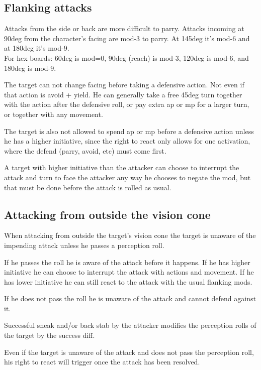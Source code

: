 \subsection*{Flanking attacks}
Attacks from the side or back are more difficult to parry. Attacks incoming at 90deg from the character's facing are mod-3 to parry. At 145deg it's mod-6 and at 180deg it's mod-9.\\
For hex boards: 60deg is mod=0, 90deg (reach) is mod-3, 120deg is mod-6, and 180deg is mod-9.

The target can not change facing before taking a defensive action. Not even if that action is avoid + yield. He can generally take a free 45deg turn together with the action after the defensive roll, or pay extra ap or mp for a larger turn, or together with any movement.

The target is also not allowed to spend ap or mp before a defensive action unless he has a higher initiative, since the right to react only allows for one activation, where the defend (parry, avoid, etc) must come first.

A target with higher initiative than the attacker can choose to interrupt the attack and turn to face the attacker any way he chooses to negate the mod, but that must be done before the attack is rolled as usual.


\subsection*{Attacking from outside the vision cone}
When attacking from outside the target's vision cone the target is unaware of the impending attack unless he passes a perception roll.

If he passes the roll he is aware of the attack before it happens. If he has higher initiative he can choose to interrupt the attack with actions and movement. If he has lower initiative he can still react to the attack with the usual flanking mods.

If he does not pass the roll he is unaware of the attack and cannot defend against it.

Successful sneak and/or back stab by the attacker modifies the perception rolls of the target by the success diff.

Even if the target is unaware of the attack and does not pass the perception roll, his right to react will trigger once the attack has been resolved.


